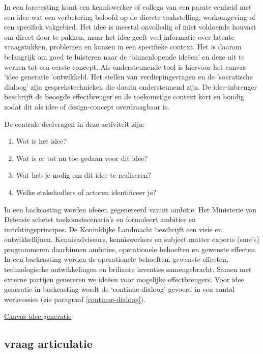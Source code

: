 \documentclass[
]{book}
\providecommand{\tightlist}{%
  \setlength{\itemsep}{0pt}\setlength{\parskip}{0pt}}
\begin{document}
In een forecasting komt een kenniswerker of collega van een parate eenheid met een idee wat een verbetering beloofd op de directe taakstelling, werkomgeving of een specifiek vakgebied. Het idee is meestal onvolledig of mist voldoende houvast om direct door te pakken, maar het idee geeft veel informatie over latente vraagstukken, problemen en kansen in een specifieke context. Het is daarom belangrijk om goed te luisteren naar de `binnenlopende ideëen' en deze uit te werken tot een eerste concept. Als ondersteunende tool is hiervoor het canvas `idee generatie 'ontwikkeld. Het stellen van verdiepingsvragen en de 'socratische dialoog' zijn gesprekstechnieken die daarin ondersteunend zijn. De idee-inbrenger beschrijft de beoogde effectbrenger en de toekomstige context kort en bondig zodat dit als idee of design-concept overdraagbaar is.

De centrale deelvragen in deze activiteit zijn:

\begin{enumerate}
\def\labelenumi{\arabic{enumi}.}
\tightlist
\item
  Wat is het idee?
\item
  Wat is er tot nu toe gedaan voor dit idee?
\item
  Wat heb je nodig om dit idee te realiseren?
\item
  Welke stakehodlers of actoren identificeer je?
\end{enumerate}

In een backcasting worden ideëen gegenereerd vanuit ambitie. Het Ministerie van Defensie schetst toekomstscenario's en formuleert ambities en inrichtingsprincipes. De Koninklijke Landmacht beschrijft een visie en ontwikkellijnen. Kennisadviseurs, kenniswerkers en subject matter experts (sme's) programmeren daarbinnen ambities, operationele behoeften en gewenste effecten. In een backcasting worden de operationele behoeften, gewenste effecten, technologische ontwikkelingen en briliante inventies samengebracht. Samen met externe partijen genereren we ideëen voor mogelijke effectbrengers. Voor idee generatie in backcasting wordt de `continue dialoog' gevoerd in een aantal werksessies (zie paragraaf \ref{continue-dialoog}).

\href{data/images/20200116-CDE-canvassen-ideegeneratie.png}{Canvas idee generatie}

\hypertarget{vraag-articulatie}{%
\subsection{vraag articulatie}\label{vraag-articulatie}}
\end{document}
